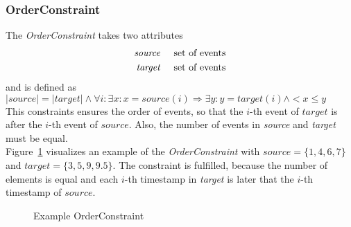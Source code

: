 	\subsubsection{OrderConstraint}
		The \emph{OrderConstraint} takes two attributes
		\begin{align*}
			\emph{source} & \hspace{.5cm}\text{set of events}\\
			\emph{target} & \hspace{.5cm}\text{set of events}
		\end{align*}
		and is defined as\\[10pt]
		\begin{math}
			|source| = |target| \land \forall i:\exists x: x=source(i)\Rightarrow \exists y: y=target(i)\land < x \leq y
		\end{math}\\[10pt]
		This constraints ensures the order of events, so that the $i$-th event of $target$ is after the $i$-th event of $source$. Also, the number of events in \emph{source} and \emph{target} must be equal.\\
		Figure~\ref{fig:OrderConstraintExample} visualizes an example of the \emph{OrderConstraint} with $source = \{1, 4, 6, 7\}$ and $target = \{3, 5, 9, 9.5\}$. The constraint is fulfilled, because the number of elements is equal and each $i$-th timestamp in \emph{target} is later that the $i$-th timestamp of $source$.
		\begin{figure}
			\caption{Example OrderConstraint}
			\label{fig:OrderConstraintExample}
		\end{figure}
		
		
